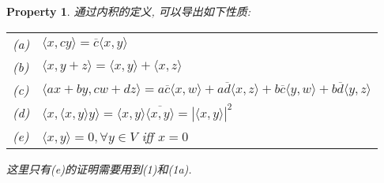 \documentclass{article}
\newtheorem{property}{Property}
\def\<{\langle}
\def\>{\rangle}
\begin{document}
\begin{property}
通过内积的定义, 可以导出如下性质:

\begin{tabular}{ll}
  (a) & $\< x, cy \> = \overline{c}\< x, y\>$ \\
  (b) & $\< x, y + z \> = \< x, y \> + \< x, z \>$ \\
  (c) & $\< ax + by, cw + dz \> = a\overline{c}\<x, w\> + a\overline{d}\<x, z\> + b\overline{c}\<y, w\> + b\overline{d}\<y, z\>$ \\
  (d) & $\< x, \<x, y\>y\> = \<x, y\>\overline{\< x, y\>} = |\<x, y\>|^2$ \\
  (e) & $\<x, y\> = 0, \forall y \in V$ iff $x = 0$
\end{tabular}

这里只有(e)的证明需要用到(1)和(1a).
\end{property}
\end{document}

